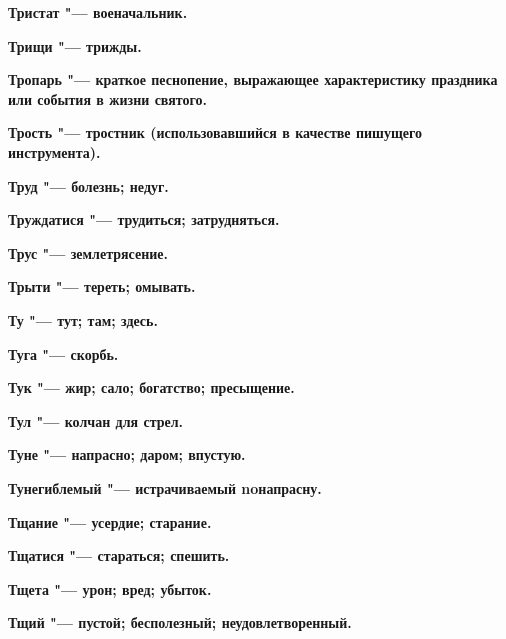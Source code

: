 \bfseries Тристат \normalfont{} "--- военачальник. 




\bfseries Трищи \normalfont{} "--- трижды. 




\bfseries Тропарь \normalfont{} "--- краткое песнопение, выражающее характеристику праздника или события в жизни святого. 




\bfseries Трость \normalfont{} "--- тростник (использовавшийся в качестве пишущего инструмента). 




\bfseries Труд \normalfont{} "--- болезнь; недуг. 




\bfseries Труждатися \normalfont{} "--- трудиться; затрудняться. 




\bfseries Трус \normalfont{} "--- землетрясение. 




\bfseries Трыти \normalfont{} "--- тереть; омывать. 




\bfseries Ту \normalfont{} "--- тут; там; здесь. 




\bfseries Туга \normalfont{} "--- скорбь. 




\bfseries Тук \normalfont{} "--- жир; сало; богатство; пресыщение. 




\bfseries Тул \normalfont{} "--- колчан для стрел. 




\bfseries Туне \normalfont{} "--- напрасно; даром; впустую. 




\bfseries Тунегиблемый \normalfont{} "--- истрачиваемый noнапрасну. 




\bfseries Тщание \normalfont{} "--- усердие; старание. 




\bfseries Тщатися \normalfont{} "--- стараться; спешить. 




\bfseries Тщета \normalfont{} "--- урон; вред; убыток. 




\bfseries Тщий \normalfont{} "--- пустой; бесполезный; неудовлетворенный. 





